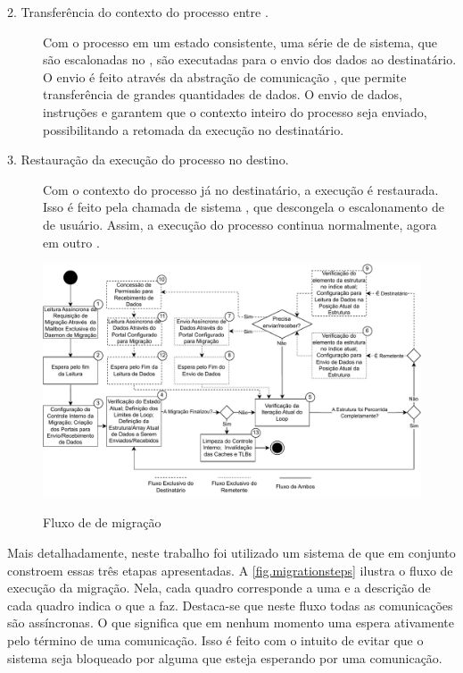 \begin{description}
	\item[2. Transferência do contexto do processo entre \clusters.] \hfill
    
    Com o processo em um estado consistente, uma série de \tasks de sistema, que são escalonadas no \mcore, são executadas para o envio dos dados ao \cluster destinatário. O envio é feito através da abstração de comunicação \portal, que permite transferência de grandes quantidades de dados. O envio de dados, instruções e \uarea garantem que o contexto inteiro do processo seja enviado, possibilitando a retomada da execução no \cluster destinatário.
    
    \item[3. Restauração da execução do processo no \cluster destino.] \hfill
	
    Com o contexto do processo já no \cluster destinatário, a execução é restaurada. Isso é feito pela chamada de sistema \unfreeze, que descongela o escalonamento de \threads de usuário. Assim, a execução do processo continua normalmente, agora em outro \cluster.
\end{description}

\begin{figure}[b]
    \centering
    \caption{Fluxo de \tasks de migração}
    \includegraphics[width=\linewidth]{content/images/migration-steps-tasks.pdf}
    \label{fig.migrationsteps}
\end{figure}

Mais detalhadamente, neste trabalho foi utilizado um sistema de \tasks que em conjunto constroem essas três etapas apresentadas. A \autoref{fig.migrationsteps} ilustra o fluxo de execução da migração. Nela, cada quadro corresponde a uma \task e a descrição de cada quadro indica o que a \task faz. Destaca-se que neste fluxo todas as comunicações são assíncronas. O que significa que em nenhum momento uma \task espera ativamente pelo término de uma comunicação. Isso é feito com o intuito de evitar que o sistema seja bloqueado por alguma \task que esteja esperando por uma comunicação. 

